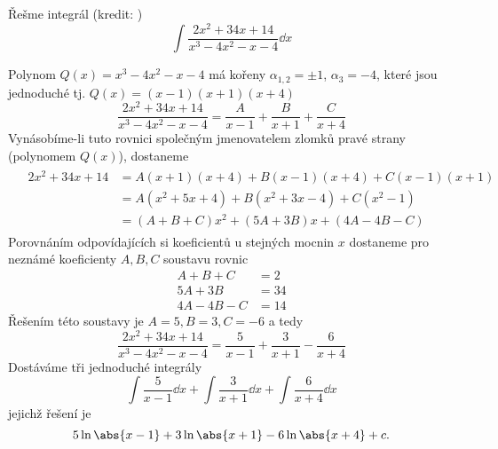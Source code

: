 \begin{mdframed}[style=mdexam]
  \begin{example}\label{MAI:exam115}
    Řešme integrál  (kredit: \cite[s.~90]{Knichal})
    \begin{equation}
      \int{\frac{2x^2+34x+14}{x^3-4x^2-x-4}}\dd{x}
    \end{equation}
    
    Polynom $Q(x)=x^3-4x^2-x-4$ má kořeny $\alpha_{1,2}=\pm1$, $\alpha_{3}=-4$, které jsou
    jednoduché tj. $Q(x)=(x-1)(x+1)(x+4)$ $$\frac{2x^2+34x+14}{x^3-4x^2-x-4} =
    \frac{A}{x-1}+\frac{B}{x+1}+\frac{C}{x+4}$$ Vynásobíme-li tuto rovnici společným
    jmenovatelem zlomků pravé strany (polynomem $Q(x)$), dostaneme
    \begin{gather*}
        \begin{flalign*}
          & 2x^2+34x+14 &= A(x+1)(x+4)+B(x-1)(x+4)+C(x-1)(x+1) \\
          &             &= A(x^2+5x+4)+B(x^2+3x-4)+C(x^2-1)    \\
          &             &= (A+B+C)x^2+(5A+3B)x + (4A-4B-C)
        \end{flalign*}
    \end{gather*}
    Porovnáním odpovídajících si koeficientů u stejných mocnin $x$  dostaneme pro nez\-ná\-mé
    koeficienty $A, B, C$ soustavu rovnic
    \begin{align*}
       A+   B + C &= 2 \\
      5A + 3B     &= 34 \\
      4A - 4B - C &= 14
    \end{align*}
    Řešením této soustavy je $A = 5, B = 3, C = -6$ a tedy
    $$\frac{2x^2+34x+14}{x^3-4x^2-x-4} = \frac{5}{x-1}+\frac{3}{x+1}-\frac{6}{x+4}$$
    Dostáváme tři jednoduché integrály
    \begin{equation*}
      \int{\frac{5}{x-1}}\dd{x} + \int{\frac{3}{x+1}}\dd{x} + \int{\frac{6}{x+4}}\dd{x}            
    \end{equation*}
    jejichž řešení je 
    \begin{equation*}
      5\ln\abs{x-1} +  3\ln\abs{x+1} - 6\ln\abs{x+4} +c.
    \end{equation*}
  \end{example}
\end{mdframed}